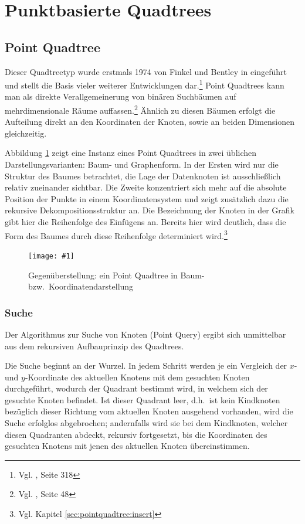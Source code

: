 \documentclass[%
			paper=a4,%
			DIV12,
			liststotoc,
			bibtotoc,
			draft=false,%
			titlepage,
			numbers=noendperiod
			]{scrartcl}
\newcommand{\zit}[3]{#1 \cite{#2}, #3}
\newcommand{\footzit}[3]{\footnote{\zit{#1}{#2}{#3}}}
\newcommand{\myfig}[5] {
 \begin{figure}[tbph]
	 \centering
	 \texttt{[image: \#1]}
	 \caption[#4]{#5}
	 \label{fig:#2}
 \end{figure}
}
\begin{document}
\section{Punktbasierte Quadtrees}
\label{sec:pointbased}
\subsection{Point Quadtree}
Dieser Quadtreetyp wurde erstmals 1974 von Finkel und Bentley in \cite{DBLP:journals/acta/FinkelB74} eingeführt und stellt die Basis vieler weiterer Entwicklungen dar.\footzit{Vgl.}{compgeom:2000}{Seite 318}
Point Quadtrees kann man als direkte Verallgemeinerung von binären Suchbäumen auf mehrdimensionale Räume auffassen.\footzit{Vgl.}{Samet90}{Seite 48}
Ähnlich zu diesen Bäumen erfolgt die Aufteilung direkt an den Koordinaten der Knoten, sowie an beiden Dimensionen gleichzeitig. 


Abbildung \ref{fig:pointquadtree} zeigt eine Instanz eines Point Quadtrees in zwei üblichen Darstellungsvarianten: Baum- und Graphenform.
In der Ersten wird nur die Struktur des Baumes betrachtet, die Lage der Datenknoten ist ausschließlich relativ zueinander sichtbar.
Die Zweite konzentriert sich mehr auf die absolute Position der Punkte in einem Koordinatensystem und zeigt zusätzlich dazu die rekursive Dekompositionsstruktur an.
Die Bezeichnung der Knoten in der Grafik gibt hier die Reihenfolge des Einfügens an. Bereits hier wird deutlich, dass die Form des Baumes durch diese Reihenfolge determiniert wird.\footnote{Vgl. Kapitel \ref{sec:pointquadtree:insert}}
\myfig{img/pointquadtree-ins7+tree-trimmed}{pointquadtree}{width=.9\textwidth}{Point Quadtree}{Gegenüberstellung: ein Point Quadtree in Baum- bzw.\ Koordinatendarstellung}

\subsubsection{Suche}
\label{sec:pointquadtree-suche}
Der Algorithmus zur Suche von Knoten (Point Query) ergibt sich unmittelbar aus dem rekursiven Aufbauprinzip des Quadtrees. 

Die Suche beginnt an der Wurzel. In jedem Schritt werden je ein Vergleich der $x$- und $y$-Koordinate des aktuellen Knotens mit dem gesuchten Knoten durchgeführt, wodurch der Quadrant bestimmt wird, in welchem sich der gesuchte Knoten befindet.
Ist dieser Quadrant leer, d.h.\ ist kein Kindknoten bezüglich dieser Richtung vom aktuellen Knoten ausgehend vorhanden, wird die Suche erfolglos abgebrochen; andernfalls wird sie bei dem Kindknoten, welcher diesen Quadranten abdeckt, rekursiv fortgesetzt, bis die Koordinaten des gesuchten Knotens mit jenen des aktuellen Knoten übereinstimmen.
\end{document}
